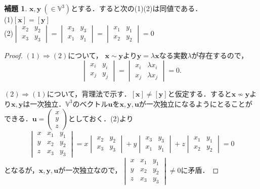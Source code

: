 \documentclass{jsarticle}
\theoremstyle{definition}
\newtheorem{lemma}[theorem]{補題}
\numberwithin{theorem}{section}
\numberwithin{equation}{section}
\begin{document}
\begin{lemma}
    $\bm{x},\bm{y}\ (\in \mathbb{V}^3)$とする．すると次の(1)(2)は同値である．
    \\(1)$[\bm{x}]=[\bm{y}]$
    \\(2)$\begin{vmatrix}
        x_2&y_2\\x_3&y_3
    \end{vmatrix}=\begin{vmatrix}
        x_3&y_3\\x_1&y_1
    \end{vmatrix}=\begin{vmatrix}
        x_1&y_1\\x_2&y_2
    \end{vmatrix}=0$
\end{lemma}
\begin{proof}
    $(1)\Rightarrow(2)$について，
    $\bm{x}\sim\bm{y}$より$\bm{y}=\lambda\bm{x}$なる実数$\lambda$が存在するので，
    $$\begin{vmatrix}
        x_i&y_i\\x_j&y_j
    \end{vmatrix}=\begin{vmatrix}
        x_i&\lambda x_i\\x_j&\lambda x_j
    \end{vmatrix}=0.$$
    \par $(2)\Rightarrow(1)$について，背理法で示す．$[\bm{x}]\neq [\bm{y}]$と仮定する．すると$\bm{x}\nsim\bm{y}$より$\bm{x},\bm{y}$は一次独立．$\mathbb{V}^3$のベクトル$\bm{u}$を$\bm{x},\bm{y},\bm{u}$が一次独立になるようにとることができる．$\bm{u}=\begin{pmatrix}
        x\\y\\z
    \end{pmatrix}$としておく．(2)より
    $$\begin{vmatrix}
        x&x_1&y_1
        \\y&x_2&y_2
        \\z&x_3&y_3
    \end{vmatrix}=x\begin{vmatrix}
       x_2&y_2\\x_3&y_3 
    \end{vmatrix}+y\begin{vmatrix}
        x_3&y_3\\x_1&y_1
    \end{vmatrix}+z\begin{vmatrix}
        x_1&y_1\\x_2&y_2
    \end{vmatrix}=0$$となるが，$\bm{x},\bm{y},\bm{u}$が一次独立なので，$\begin{vmatrix}
        x&x_1&y_1
        \\y&x_2&y_2
        \\z&x_3&y_3
    \end{vmatrix}\neq 0$に矛盾．
\end{proof}
\end{document}
